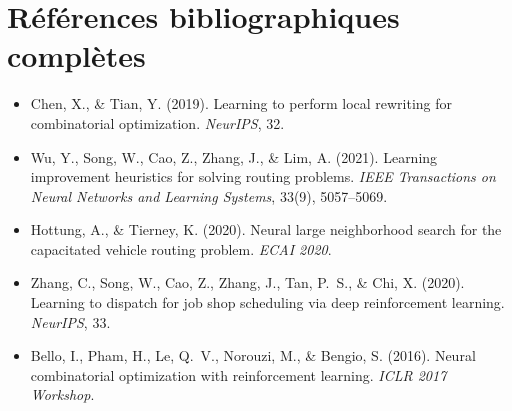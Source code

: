\documentclass[11pt,a4paper]{article}
\begin{document}
\section*{Références bibliographiques complètes}

\begin{itemize}
  \item Chen, X., \& Tian, Y. (2019). Learning to perform local rewriting for
    combinatorial optimization. \textit{NeurIPS}, 32.
  \item Wu, Y., Song, W., Cao, Z., Zhang, J., \& Lim, A. (2021). Learning
    improvement heuristics for solving routing problems. \textit{IEEE
    Transactions on Neural Networks and Learning Systems}, 33(9), 5057--5069.
  \item Hottung, A., \& Tierney, K. (2020). Neural large neighborhood search
    for the capacitated vehicle routing problem. \textit{ECAI 2020}.
  \item Zhang, C., Song, W., Cao, Z., Zhang, J., Tan, P.~S., \& Chi, X. (2020).
    Learning to dispatch for job shop scheduling via deep reinforcement learning.
    \textit{NeurIPS}, 33.
  \item Bello, I., Pham, H., Le, Q.~V., Norouzi, M., \& Bengio, S. (2016).
    Neural combinatorial optimization with reinforcement learning.
    \textit{ICLR 2017 Workshop}.
\end{itemize}
\end{document}
